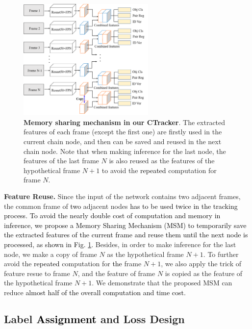 \documentclass[../arXiv_main.tex]{subfiles}
\newcommand\pjl[1]{\textcolor{black}{#1}}
\newcommand\wfb[1]{\textcolor{black}{#1}}
\newcommand\CRwfb[1]{\textcolor{black}{#1}}
\newcommand{\CRyang}[1]{\textcolor{black}{#1}}
\begin{document}
\begin{figure}[t!]
\begin{centering}
\includegraphics[width=0.6\textwidth]{figure/memory.png} 
\par\end{centering}
\caption {\textbf{Memory sharing mechanism in our CTracker}. The extracted features of each frame (except the first one) are firstly used in the current chain node, and then can be saved and reused in the next chain node. Note that when making inference for the last node, the features of the last frame $N$ is also reused as the features of the hypothetical frame $N+1$ to avoid the \CRwfb{repeated} computation for frame $N$. \label{fig:memory}}
\end{figure}

\noindent \textbf{Feature Reuse.} Since the input of the network contains two adjacent frames, the common frame of \CRyang{two} adjacent nodes \CRyang{has to be used twice}
\pjl{in the tracking process.}
\wfb{To avoid the nearly double cost of computation and memory in inference, we propose a Memory Sharing Mechanism (MSM) to temporarily save the extracted features of the current frame and reuse them until the next node is processed, as shown in Fig. \ref{fig:memory}.} Besides, in order to make inference for the last node, we make a copy of frame $N$ as the hypothetical frame $N+1$. To further avoid the \CRwfb{repeated} computation for \CRwfb{the} frame $N+1$, we also apply the trick of feature resue to frame $N$, and the feature of frame $N$ is copied as the feature of the hypothetical frame $N+1$. We demonstrate that the proposed MSM can reduce \CRwfb{almost half of the overall computation and time cost.} 



\subsection{Label \CRyang{Assignment} and Loss Design\label{subsection:loss}}
\end{document}
